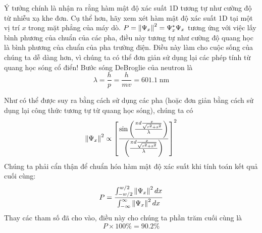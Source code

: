 



\begin{solution}
Ý tưởng chính là nhận ra rằng hàm mật độ xác suất 1D tương tự như cường độ từ nhiễu xạ khe đơn. Cụ thể hơn, hãy xem xét hàm mật độ xác suất 1D tại một vị trí $x$ trong mặt phẳng của máy dò. $P = \norm{\Psi_x}^2 = \Psi_x ^{\ast} \Psi_x$ tương ứng với việc lấy bình phương của chuẩn của các pha, điều này tương tự như cường độ quang học là bình phương của chuẩn của pha trường điện.
\newline
\newline
Điều này làm cho cuộc sống của chúng ta dễ dàng hơn, vì chúng ta có thể đơn giản sử dụng lại các phép tính từ quang học sóng cổ điển! Bước sóng DeBroglie của neutron là $$\lambda = \frac{h}{p} = \frac{h}{mv} = 601.1\;\mathrm{nm}$$ 

Như có thể được suy ra bằng cách sử dụng các pha (hoặc đơn giản bằng cách sử dụng lại công thức tương tự từ quang học sóng), chúng ta có
$$\norm{\Psi_x}^2 \propto {\left[\frac {\sin \left(\frac {\pi d \frac{x}{\sqrt{r^2 + x^2}}}{\lambda}\right)}{\left(\frac {\pi d \frac{x}{\sqrt{r^2 + x^2}}}{\lambda}\right)}\right]^2} $$
Chúng ta phải cẩn thận để chuẩn hóa hàm mật độ xác suất khi tính toán kết quả cuối cùng:
$$P = \frac {\int_{-w/2}^{w/2}\norm{\Psi_x}^2\,dx}{\int_{-\infty}^{\infty}\norm{\Psi_x}^2\,dx} $$
Thay các tham số đã cho vào, điều này cho chúng ta phần trăm cuối cùng là $$P\times100\% = \boxed{90.2\%}$$


\end{solution}
